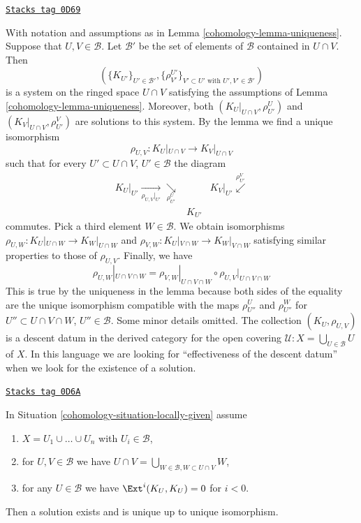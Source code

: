 \begin{remark}[Uniqueness]
\label{cohomology-remark-uniqueness}
\href{https://stacks.math.columbia.edu/tag/0D69}{\texttt{Stacks tag 0D69}}

With notation and assumptions as in Lemma \ref{cohomology-lemma-uniqueness}.
Suppose that $U, V \in \mathcal{B}$. Let $\mathcal{B}'$ be the set of
elements of $\mathcal{B}$ contained in $U \cap V$. Then
$$
(\{K_{U'}\}_{U' \in \mathcal{B}'},
\{\rho_{V'}^{U'}\}_{V' \subset U'\text{ with }U', V' \in \mathcal{B}'})
$$
is a system on the ringed space $U \cap V$
satisfying the assumptions of Lemma \ref{cohomology-lemma-uniqueness}.
Moreover, both $(K_U|_{U \cap V}, \rho^U_{U'})$ and
$(K_V|_{U \cap V}, \rho^V_{U'})$ are solutions to this system.
By the lemma we find a unique isomorphism
$$
\rho_{U, V} : K_U|_{U \cap V} \longrightarrow K_V|_{U \cap V}
$$
such that for every $U' \subset U \cap V$, $U' \in \mathcal{B}$ the
diagram
$$
\begin{array}{ccc}K_U|_{U'} \underset{\rho_{U, V}|_{U'}}{\longrightarrow}\underset{\rho^U_{U'}}{\searrow} &  & K_V|_{U'} \overset{\rho^V_{U'}}{\swarrow} \\  & K_{U'} & \end{array}
$$
commutes. Pick a third element $W \in \mathcal{B}$. We obtain isomorphisms
$\rho_{U, W} : K_U|_{U \cap W} \to K_W|_{U \cap W}$ and
$\rho_{V, W} : K_U|_{V \cap W} \to K_W|_{V \cap W}$ satisfying
similar properties to those of $\rho_{U, V}$. Finally,
we have
$$
\rho_{U, W}|_{U \cap V \cap W} =
\rho_{V, W}|_{U \cap V \cap W} \circ \rho_{U, V}|_{U \cap V \cap W}
$$
This is true by the uniqueness in the lemma
because both sides of the equality are the unique isomorphism
compatible with the maps $\rho^U_{U''}$ and $\rho^W_{U''}$
for $U'' \subset U \cap V \cap W$, $U'' \in \mathcal{B}$.
Some minor details omitted.
The collection $(K_U, \rho_{U, V})$ is a descent datum
in the derived category for the open covering
$\mathcal{U} : X = \bigcup_{U \in \mathcal{B}} U$ of $X$.
In this language we are looking for ``effectiveness of the descent datum''
when we look for the existence of a solution.
\end{remark}

\begin{lemma}
\label{cohomology-lemma-solution-in-finite-case}
\href{https://stacks.math.columbia.edu/tag/0D6A}{\texttt{Stacks tag 0D6A}}

In Situation \ref{cohomology-situation-locally-given} assume
\begin{enumerate}
\item $X = U_1 \cup \ldots \cup U_n$ with $U_i \in \mathcal{B}$,
\item for $U, V \in \mathcal{B}$ we have
$U \cap V = \bigcup_{W \in \mathcal{B}, W \subset U \cap V} W$,
\item for any $U \in \mathcal{B}$ we have $\Ext^i(K_U, K_U) = 0$
for $i < 0$.
\end{enumerate}
Then a solution exists and is unique up to unique isomorphism.
\end{lemma}

